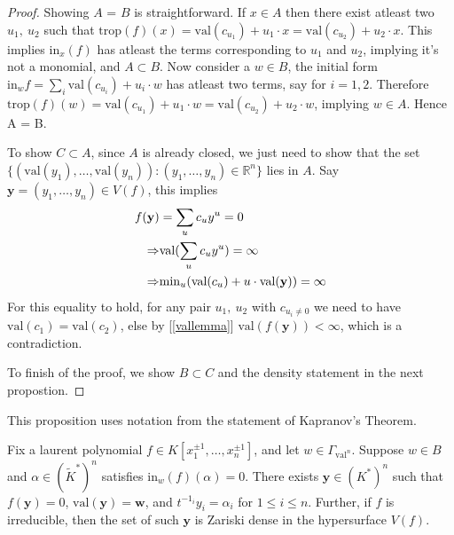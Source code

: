     \begin{proof}
        Showing $A$ = $B$ is straightforward. 
        If $x \in A$ then there exist atleast two $u_1,~u_2$ such that $\text{trop}(f)(x) = \text{val}(c_{u_{1}}) + u_{1}\cdot x = \text{val}(c_{u_{2}}) + u_{2}\cdot x$. 
        This implies $\text{in}_{x}(f)$ has atleast the terms corresponding to $u_1$ and $u_2$, implying it's not a monomial, and $A \subset B$.
        Now consider a $w \in B$, the initial form $\text{in}_{w}f = \sum_i \text{val}(c_{u_{i}}) + u_i \cdot w$ has atleast two terms, say for $i=1,2$. 
        Therefore $\text{trop}(f)(w) = \text{val}(c_{u_{1}}) + u_{1}\cdot w = \text{val}(c_{u_{2}}) + u_{2}\cdot w$, implying $w \in A$.
        Hence A = B.
        \par To show $C \subset A$, since $A$ is already closed, we just need to show that the set $\{(\text{val}(y_1), \dots, \text{val}(y_n)): (y_1,\dots, y_n) \in \mathbb{R}^{n}\}$ lies in $A$. Say $\textbf{y} = (y_1,\dots,y_n) \in V(f)$, this implies 
        \begin{align*}
            f(\textbf{y}) &= \sum_u c_u y^{u} = 0 \\
            \Rightarrow&\text{val}(\sum_u c_u y^{u}) = \infty \\
            \Rightarrow& \text{min}_u(\text{val}(c_u) + u \cdot \text{val(\textbf{y})}) = \infty
        \end{align*}
        For this equality to hold, for any pair $u_{1},~u_{2}$ with $c_{u_{i} \neq 0}$ we need to have $\text{val}(c_1) = \text{val}(c_2)$, else by [\ref{vallemma}] $\text{val}(f(\textbf{y})) < \infty$, which is a contradiction. 
        \par To finish of the proof, we show $B \subset C$ and the density statement in the next propostion.
    \end{proof}
    This proposition uses notation from the statement of Kapranov's Theorem.
    \begin{proposition}
        Fix a laurent polynomial $f \in  K[x_{1}^{\pm1}, \dots, x_{n}^{\pm1}]$, and let $w \in \Gamma_{\text{val}^{n}}$. 
        Suppose $w \in B$ and $\alpha \in (\tilde{K}^{*})^{n}$ satisfies $\text{in}_{w}(f)(\alpha) = 0$. 
        There exists $\textbf{y} \in (K^{*})^{n}$ such that $f(\textbf{y}) = 0$,  $\text{val}(\textbf{y}) = \textbf{w}$, and $t^{-1_{i}}y_{i}=\alpha_{i}$ for $1 \leq i \leq n$.
        Further, if $f$ is irreducible, then the set of such $\textbf{y}$ is Zariski dense in the hypersurface $V(f)$.
    \end{proposition}
